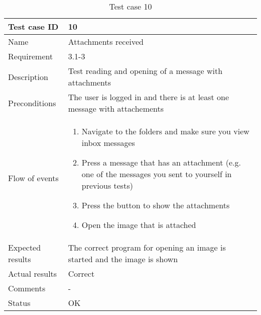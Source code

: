 		\begin{table}[htb]
			\begin{tabular}{l|p{10cm}}
				Test case ID & 10 \\ \hline
				Name & Attachments received\\ \hline
				Requirement & 3.1-3\\ \hline
				Description & Test reading and opening of a message with attachments\\ \hline
				Preconditions & The user is logged in and there is at least one message with attachements\\ \hline
				Flow of events & 
					\begin{enumerate}
						\item{}Navigate to the folders and make sure you view inbox messages
						\item{}Press a message that has an attachment (e.g. one of the messages you sent to yourself in previous tests)
						\item{}Press the button to show the attachments
						\item{}Open the image that is attached
					\end{enumerate} \\ \hline
				Expected results & The correct program for opening an image is started and the image is shown \\ \hline
				Actual results &Correct\\ \hline
				Comments &-\\ \hline
				Status &OK \\ \hline
			\end{tabular}
			\caption{Test case 10} \label{tab:case10}
		\end{table}

